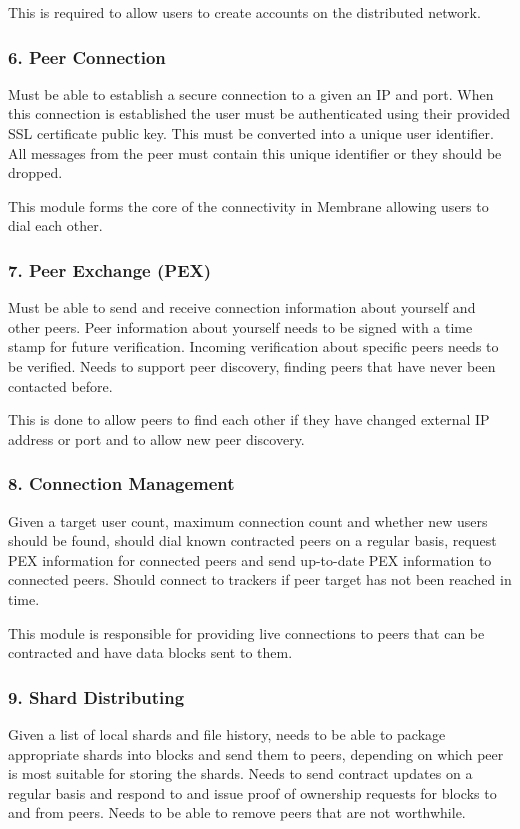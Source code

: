 \documentclass[11pt, a4paper, twocolumn, twoside]{report}
\begin{document}
This is required to allow users to create accounts on the distributed network.

\subsubsection{6. Peer Connection}
Must be able to establish a secure connection to a given an IP and port. When this connection is established the user must be authenticated using their provided SSL certificate public key. This must be  converted into a unique user identifier. All messages from the peer must contain this unique identifier or they should be dropped.

This module forms the core of the connectivity in Membrane allowing users to dial each other.

\subsubsection{7. Peer Exchange (PEX)}
Must be able to send and receive connection information about yourself and other peers. Peer information about yourself needs to be signed with a time stamp for future verification. Incoming verification about specific peers needs to be verified. Needs to support peer discovery, finding peers that have never been contacted before.

This is done to allow peers to find each other if they have changed external IP address or port and to allow new peer discovery.

\subsubsection{8. Connection Management}
Given a target user count, maximum connection count and whether new users should be found, should dial known contracted peers on a regular basis, request PEX information for connected peers and send up-to-date PEX information to connected peers. Should connect to trackers if peer target has not been reached in time.

This module is responsible for providing live connections to peers that can be contracted and have data blocks sent to them.

\subsubsection{9. Shard Distributing}
Given a list of local shards and file history, needs to be able to package appropriate shards into blocks and send them to peers, depending on which peer is most suitable for storing the shards. Needs to send contract updates on a regular basis and respond to and issue proof of ownership requests for blocks to and from peers. Needs to be able to remove peers that are not worthwhile.
\end{document}
